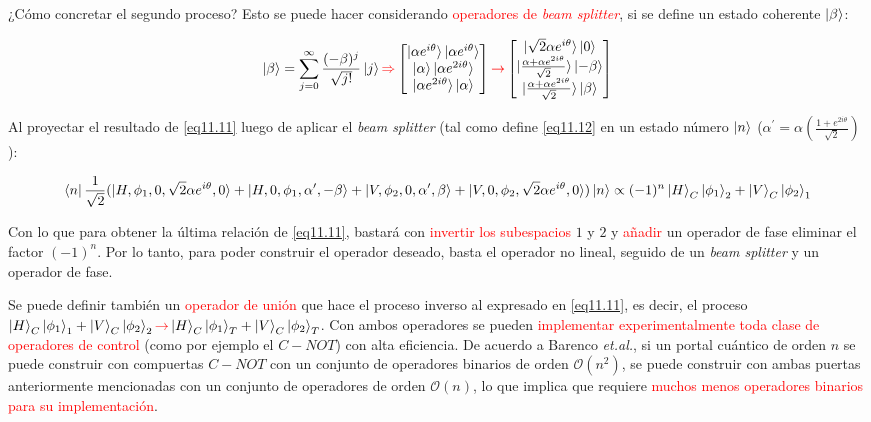 \documentclass{book}
\begin{document}
¿Cómo concretar el segundo proceso? Esto se puede hacer considerando \textcolor{red}{operadores de \textit{beam splitter}}, si se define un estado coherente $\ket{\beta}$:

\begin{equation}\label{eq11.12}\ket{\beta}=\sum_{j=0}^\infty \frac{(-\beta)^j}{\sqrt{j!}}\ket{j}\textcolor{red}{\Rightarrow} \begin{bmatrix}\ket{\alpha e^{i\theta}}\ket{\alpha e^{i\theta}}\\\ket{\alpha}\ket{\alpha e^{2i\theta}}\\\ket{\alpha e^{2i\theta}}\ket{\alpha} \end{bmatrix}\textcolor{red}{\rightarrow}\begin{bmatrix}\ket{\sqrt{2}\alpha e^{i\theta}}\ket{0}\\\ket{\frac{\alpha +\alpha e^{2i\theta}}{\sqrt{2}}}\ket{-\beta} \\\ket{\frac{\alpha +\alpha e^{2i\theta}}{\sqrt{2}}}\ket{\beta} \end{bmatrix}\end{equation}

Al proyectar el resultado de \ref{eq11.11} luego de aplicar el \textit{beam splitter} (tal como define  \ref{eq11.12} en un estado número $\ket{n}$ ($\alpha^\prime=\alpha(\frac{1+e^{2i\theta}}{\sqrt{2}})$):

\begin{equation}\label{eq11.13} \bra{n}\frac{1}{\sqrt{2}}(\ket{H,\phi_1,0,\sqrt{2}\alpha e^{i\theta},0}+\ket{H,0,\phi_1,\alpha^\prime,-\beta}+\ket{V,\phi_2,0,\alpha^\prime,\beta}+\ket{V,0,\phi_2,\sqrt{2}\alpha e^{i\theta},0})\ket{n}\propto (-1)^n\ket{H}_C\ket{\phi_1}_2+\ket{V}_C\ket{\phi_2}_1\end{equation}

Con lo que para obtener la última relación de \ref{eq11.11}, bastará con \textcolor{red}{invertir los subespacios} $1$ y $2$ y \textcolor{red}{añadir} un operador de fase eliminar el factor $(-1)^n$. Por lo tanto, para poder construir el operador deseado, basta el operador no lineal, seguido de un \textit{beam splitter} y un operador de fase. 

Se puede definir también un \textcolor{red}{operador de unión} que hace el proceso inverso al expresado en \ref{eq11.11}, es decir, el proceso $\ket{H}_C\ket{\phi_1}_1+\ket{V}_C\ket{\phi_2}_2\textcolor{red}{\rightarrow}\ket{H}_C\ket{\phi_1}_T+\ket{V}_C\ket{\phi_2}_T$. Con ambos operadores se pueden \textcolor{red}{implementar experimentalmente toda clase de operadores de control} (como por ejemplo el $C-NOT$) con alta eficiencia. De acuerdo a Barenco \textit{et.al.}, si un portal cuántico de orden $n$ se puede construir con compuertas $C-NOT$ con un conjunto de operadores binarios de orden $\mathcal{O}(n^2)$, se puede construir con ambas puertas anteriormente mencionadas con un conjunto de operadores de orden $\mathcal{O}(n)$, lo que implica que requiere \textcolor{red}{muchos menos operadores binarios para su implementación}.
\end{document}
